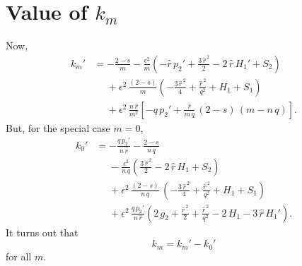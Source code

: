 \documentclass[12pt,prb,aps,notitlepage]{revtex4-1}
\begin{document}
\section{Value of $k_m$}
Now, 
\begin{align}
k_m'&= -\frac{2-s}{m}
-\frac{\epsilon^2}{m}\left(-\hat{r}\,p_2'+
\frac{3\,\hat{r}^{\,2}}{2}-2\,\hat{r}\,H_1' +S_2\right)\nonumber\\[0.5ex]
&\phantom{=}
+\epsilon^2\,\frac{(2-s)}{m}\left(-\frac{3\,\hat{r}^{\,2}}{4} +\frac{\hat{r}^{\,2}}{q^2}+H_1+S_1\right)\nonumber\\[0.5ex]
&\phantom{=}
+\epsilon^2\,\frac{n\,\hat{r}}{m^2}\left[-q\,p_2' + \frac{\hat{r}}{m\,q}\,(2-s)\,(m-n\,q)\right].
\end{align}
But, for the special case $m=0$, 
\begin{align}
k_0' &= - \frac{q\,p_2'}{n\,\hat{r}} - \frac{2-s}{n\,q} 
\nonumber\\[0.5ex]
&\phantom{=}-\frac{\epsilon^2}{n\,q}\left(
\frac{3\,\hat{r}^{\,2}}{2}-2\,\hat{r}\,H_1+S_2\right)\nonumber\\[0.5ex]
&\phantom{=}
+\epsilon^2\,\frac{(2-s)}{n\,q}\,\left(-\frac{3\,\hat{r}^{\,2}}{4} +\frac{\hat{r}^{\,2}}{q^2}+H_1 +S_1\right)\nonumber\\[0.5ex]
&\phantom{=}
+\epsilon^2\,\frac{q\,p_2'}{n\,\hat{r}}\left(2\,g_2+\frac{\hat{r}^{\,2}}{2}+\frac{\hat{r}^{\,2}}{q^2}-2\,H_1-3\,\hat{r}\,H_1'\right).
\end{align}
It turns out that
\begin{equation}
k_m = k_m' - k_0'
\end{equation}
for all $m$. 


\iffalse
\end{document}
